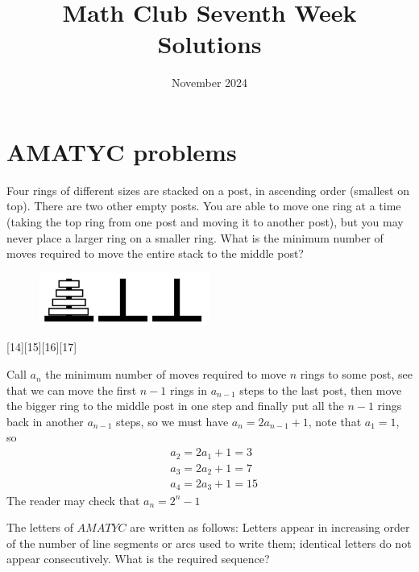 \documentclass[12pt]{article}
\title{Math Club Seventh Week Solutions}
\date{November 2024}
\newcounter{problem}
\begin{document}
\sloppy
\thispagestyle{fancy}

\section*{AMATYC problems}

\begin{problem}
   Four rings of different sizes are stacked on a post, in ascending order (smallest on top). There are two other empty posts. You are able to move one ring at a time (taking the top ring from one post and moving it to another post), but you may never place a larger ring on a smaller ring. What is the minimum number of moves required to move the entire stack to the middle post?
   \vspace{-1em}
\begin{figure}[h]
  \centering
  \includegraphics[width=0.5\textwidth]{piles.png}
\end{figure}
\vskip -3mm
\end{problem}
[14][15][16][17] 
\begin{solution}[C]
      Call $a_n$ the minimum number of moves required to move $n$ rings to some post, see that we can move the first $n-1$ rings in $a_{n-1}$ steps to the last post, then move the bigger ring to the middle post in one step and finally put all the $n-1$ rings back in another $a_{n-1}$ steps, so we must have $a_n=2a_{n-1}+1$, note that $a_1=1$, so
      \begin{align*}
         &a_2 = 2a_1+1=3\\
         &a_3 = 2a_2+1=7\\
         &a_4 = 2a_3+1=\boxed{15}
      \end{align*}
      The reader may check that $a_n=2^n-1$
\end{solution}

\begin{problem}
   The letters of $AMATYC$ are written as follows: Letters appear in increasing order of the number of line segments or arcs used to write them; identical letters do not appear consecutively. What is the required sequence?
\end{problem}
\end{document}
